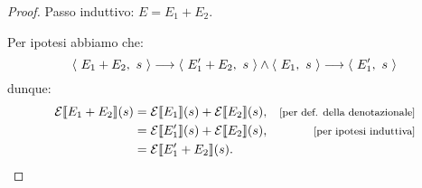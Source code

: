 \begin{proposizione}
\begin{proof}
Passo induttivo: $E = E_1 + E_2$.

Per ipotesi abbiamo che:
\[
  \langle\ E_1 + E_2,\ s\ \rangle \longrightarrow \langle\ E_1' + E_2,\ s\ \rangle \land
  \langle\ E_1,\ s\ \rangle \longrightarrow \langle\ E_1',\ s\ \rangle
\]
dunque:
\begin{align*}
  \calE\llbracket E_1 + E_2 \rrbracket(s)
  &= \calE\llbracket E_1 \rrbracket(s) +  \calE\llbracket E_2
    \rrbracket(s),
    &\law{per def. della denotazionale} \\
  &= \calE\llbracket E_1' \rrbracket(s) +  \calE\llbracket E_2
    \rrbracket(s),
    &\law{per ipotesi induttiva} \\
  &= \calE\llbracket E_1' + E_2 \rrbracket(s).
\end{align*}
\end{proof}
\end{proposizione}

